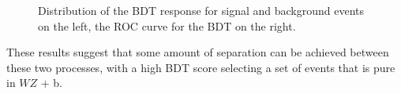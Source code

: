 \begin{figure}[H]
\center
    \caption{Distribution of the BDT response for signal and background events on the left, the ROC curve for the BDT on the right.}
    \label{fig:tZ_bdt}
\end{figure}

These results suggest that some amount of separation can be achieved between these two processes, with a high BDT score selecting a set of events that is pure in $WZ$ + b. 

